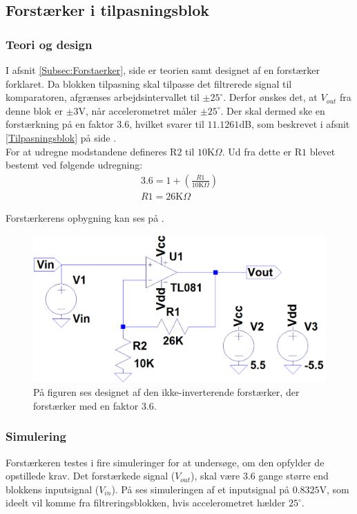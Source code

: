 \subsection{Forstærker i tilpasningsblok}\label{Forstaerker_faktor3_afs}
\subsubsection{Teori og design}
I afsnit \ref{Subsec:Forstaerker}, side \pageref{Subsec:Forstaerker} er teorien samt designet af en forstærker forklaret. Da blokken tilpasning skal tilpasse det filtrerede signal til komparatoren, afgrænses arbejdsintervallet til $\pm25^{\circ}$. Derfor ønskes det, at $V_{out}$ fra denne blok er $\pm3$V, når accelerometret måler $\pm25^{\circ}$. Der skal dermed ske en forstærkning på en faktor $3.6$, hvilket svarer til $11.1261$dB, som beskrevet i afsnit \ref{Tilpasningsblok} på side \pageref{Tilpasningsblok}. \\
For at udregne modstandene defineres R$2$ til $10$K$\Omega$. Ud fra dette er R$1$ blevet bestemt ved følgende udregning:
\begin{eqnarray}
3.6 = 1 + (\frac{R1}{10\text{K}\Omega}) \\
R1 = 26\text{K}\Omega
\end{eqnarray}

\noindent Forstærkerens opbygning kan ses på .
\begin{figure}[H]
	\centering
	\includegraphics[scale=0.35]{figures/cProblemloesning/Forstaerker_faktor3.PNG}
	\caption{På figuren ses designet af den ikke-inverterende forstærker, der forstærker med en faktor $3.6$.}
	\label{fig:Forstaerker_faktor3}
\end{figure}

\subsubsection{Simulering}
Forstærkeren testes i fire simuleringer for at undersøge, om den opfylder de opstillede krav. Det forstærkede signal ($V_{out}$), skal være $3.6$ gange større end blokkens inputsignal ($V_{in}$). På  ses simuleringen af et inputsignal på $0.8325$V, som ideelt vil komme fra filtreringsblokken, hvis accelerometret hælder $25^{\circ}$.

